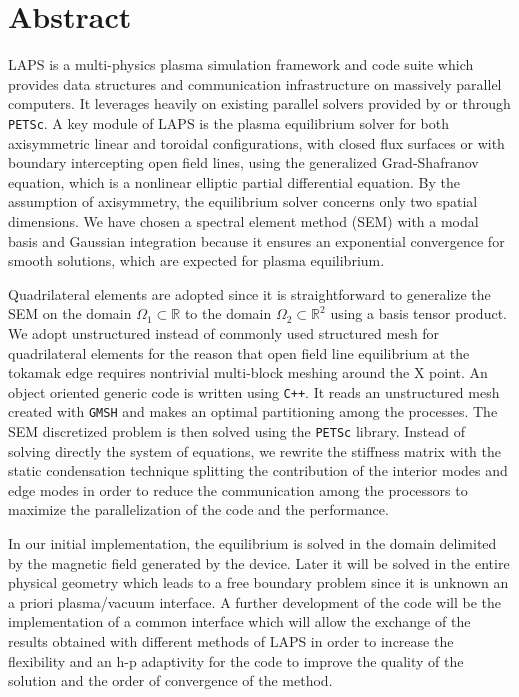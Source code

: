 \chapter*{Abstract}
LAPS is a multi-physics plasma simulation framework and code suite which provides data structures and communication infrastructure on massively parallel computers. It leverages heavily on existing parallel solvers provided by or through \verb|PETSc|. A key module of LAPS is the plasma equilibrium solver for both axisymmetric linear and toroidal configurations, with closed flux surfaces or with boundary intercepting open field lines, using the generalized Grad-Shafranov equation, which is a nonlinear elliptic partial differential equation. By the assumption of axisymmetry, the equilibrium solver concerns only two spatial dimensions.  We have chosen a spectral element method (SEM) with a modal basis and Gaussian integration because it ensures an exponential convergence for smooth solutions, which are expected for plasma equilibrium.

Quadrilateral elements are adopted since it is straightforward to generalize the SEM on the domain $\Omega_1\subset\mathbb{R}$ to the domain $\Omega_2\subset\mathbb{R}^2$ using a basis tensor product. We adopt unstructured instead of commonly used structured mesh for quadrilateral elements for the reason that open field line equilibrium at the tokamak edge requires nontrivial multi-block meshing around the X point. An object oriented generic code is written using \verb|C++|. It reads an unstructured mesh created with \verb|GMSH| and makes an optimal partitioning among the processes. The SEM discretized problem is then solved using the \verb|PETSc| library. Instead of solving directly the system of equations, we rewrite the stiffness matrix with the static condensation technique splitting the contribution of the interior modes and edge modes in order to reduce the communication among the processors to maximize the parallelization of the code and the performance.

In our initial implementation, the equilibrium is solved in the domain delimited by the magnetic field generated by the device. Later it will be solved in the entire physical geometry which leads to a free boundary problem since it is unknown an a priori plasma/vacuum interface. A further development of the code will be the implementation of a common interface which will allow the exchange of the results obtained with different methods of LAPS in order to increase the flexibility and an h-p adaptivity for the code to improve the quality of the solution and the order of convergence of the method.
